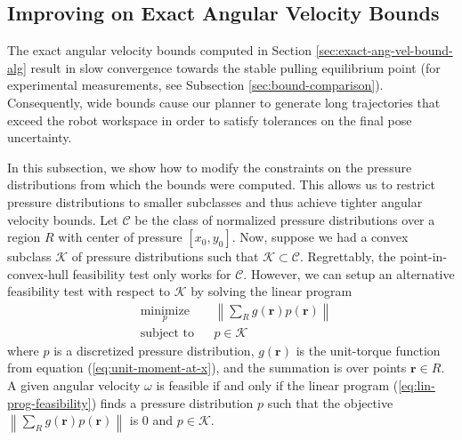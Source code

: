 \documentclass[conference]{IEEEtran}
\begin{document}

\subsection{Improving on Exact Angular Velocity Bounds}\label{sec:point-in-moment-enve}


The exact angular velocity bounds computed in Section
\ref{sec:exact-ang-vel-bound-alg} result in slow convergence towards
the stable pulling equilibrium point (for experimental measurements,
see Subsection \ref{sec:bound-comparison}). Consequently, wide bounds
cause our planner to generate long trajectories that exceed the robot
workspace in order to satisfy tolerances on the final pose
uncertainty.

In this subsection, we show how to modify the constraints on the
pressure distributions from which the bounds were computed. This
allows us to restrict pressure distributions to smaller subclasses and
thus achieve tighter angular velocity bounds. Let $\mathcal{C}$ be the
class of normalized pressure distributions over a region $R$ with
center of pressure $[x_0, y_0]$.
Now, suppose we had a convex subclass $\mathcal{K}$ of pressure
distributions such that $\mathcal{K} \subset
\mathcal{C}$. Regrettably, the point-in-convex-hull feasibility test
only works for $\mathcal{C}$. However, we can setup an alternative
feasibility test with respect to $\mathcal{K}$ by solving the linear
program
\begin{equation}
  \begin{aligned}
    & \underset{p}{\text{minimize}}
    & & \left\lVert \sum_Rg(\mathbf{r})p(\mathbf{r})\right\rVert \\
    & \text{subject to} 
    & & p \in \mathcal{K}
  \end{aligned} \label{eq:lin-prog-feasibility}
\end{equation}
where $p$ is a discretized pressure distribution, $g(\mathbf{r})$ is
the unit-torque function from equation (\ref{eq:unit-moment-at-x}),
and the summation is over points $\mathbf{r} \in R$. A given angular
velocity $\omega$ is feasible if and only if the linear program
(\ref{eq:lin-prog-feasibility}) finds a pressure distribution $p$ such
that the objective
$\left\lVert \sum_Rg(\mathbf{r})p(\mathbf{r})\right\rVert$ is $0$ and
$p \in \mathcal{K}$.
\end{document}
